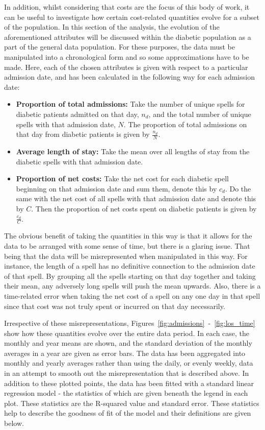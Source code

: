 In addition, whilst considering that costs are the focus of this body of work,
it can be useful to investigate how certain cost-related quantities evolve for a
subset of the population. In this section of the analysis, the evolution of the
aforementioned attributes will be discussed within the diabetic population as a
part of the general data population. For these purposes, the data must be
manipulated into a chronological form and so some approximations have to be
made. Here, each of the chosen attributes is given with respect to a particular
admission date, and has been calculated in the following way for each admission
date:

\begin{itemize}
    \item \textbf{Proportion of total admissions:} Take the number of unique
        spells for diabetic patients admitted on that day, \(n_d\), and the
        total number of unique spells with that admission date, \(N\). The
        proportion of total admissions on that day from diabetic patients is
        given by \(\frac{n_d}{N}\).
    \item \textbf{Average length of stay:} Take the mean over all lengths of
        stay from the diabetic spells with that admission date.
    \item \textbf{Proportion of net costs:} Take the net cost for each diabetic
        spell beginning on that admission date and sum them, denote this by
        \(c_d\). Do the same with the net cost of all spells with that admission
        date and denote this by \(C\). Then the proportion of net costs spent on
        diabetic patients is given by \(\frac{c_d}{C}\).
\end{itemize}

The obvious benefit of taking the quantities in this way is that it allows for
the data to be arranged with some sense of time, but there is a glaring issue.
That being that the data will be misrepresented when manipulated in this way.
For instance, the length of a spell has no definitive connection to the
admission date of that spell. By grouping all the spells starting on that day
together and taking their mean, any adversely long spells will push the mean
upwards. Also, there is a time-related error when taking the net cost of a spell
on any one day in that spell since that cost was not truly spent or incurred on
that day necessarily.

Irrespective of these misrepresentations,
Figures~\ref{fig:admissions}~\--~\ref{fig:los_time} show how these quantities
evolve over the entire data period. In each case, the monthly and year means are
shown, and the standard deviation of the monthly averages in a year are given as
error bars. The data has been aggregated into monthly and yearly averages rather
than using the daily, or evenly weekly, data in an attempt to smooth out the
misrepresentation that is described above. In addition to these plotted points,
the data has been fitted with a standard linear regression model \-- the
statistics of which are given beneath the legend in each plot. These statistics
are the R-squared value and standard error. These statistics help to describe
the goodness of fit of the model and their definitions are given below.

